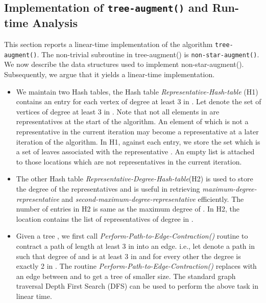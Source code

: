 \documentclass[runningheads]{llncs}
\begin{document}
\subsection{Implementation of {\tt tree-augment()} and Run-time Analysis}
This section reports a linear-time implementation of the algorithm {\tt tree-augment()}.  The non-trivial subroutine in tree-augment() is {\tt non-star-augment()}.  We now describe the data structures used to implement non-star-augment().  Subsequently, we argue that it yields a linear-time implementation. 
\begin{itemize}
\item We maintain two Hash tables, the Hash table {\em Representative-Hash-table} (H1) contains an entry for each vertex of degree at least 3 in .  Let  denote the set of vertices of degree at least 3 in .  Note that not all elements in  are representatives at the start of the algorithm.  An element of  which is not a representative in the current iteration may become a representative at a later iteration of the algorithm.  In H1, against each entry, we store the set  which is a set of leaves associated with the representative .   An empty list is attached to those locations which are not representatives in the current iteration.
\item The other Hash table {\em Representative-Degree-Hash-table}(H2) is used to store the degree of the representatives and is useful in retrieving {\em maximum-degree-representative} and {\em second-maximum-degree-representative} efficiently.   The number of entries in H2 is same as the maximum degree of .  In H2, the location  contains the list of representatives of degree  in .  
\item Given a tree , we first call {\em Perform-Path-to-Edge-Contraction()} routine to contract a path of length at least 3 in  into an edge. i.e., let  denote a path in  such that degree of  and  is at least 3 in  and for every other  the degree is exactly 2 in .  The routine {\em Perform-Path-to-Edge-Contraction()} replaces  with an edge between  and  to get a tree of smaller size.  The standard graph traversal Depth First Search (DFS) can be used to perform the above task in linear time. 

\end{itemize}
\end{document}
